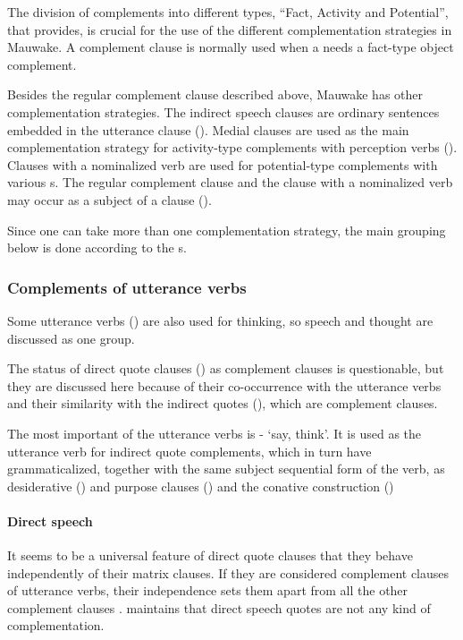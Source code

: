 The division of complements into different types, ``Fact, Activity and Potential'', that \citet[371]{Dixon2010b} provides, is crucial for the use of the different complementation strategies in Mauwake.  A complement clause is normally used when a  needs a fact-type object complement.

Besides the regular complement clause described above, Mauwake has other complementation strategies. The indirect speech clauses are ordinary sentences embedded in the utterance clause (). Medial clauses are used as the main complementation strategy for activity-type complements with perception verbs (). Clauses with a nominalized verb are used for potential-type complements with various s. The regular complement clause and the clause with a nominalized verb may occur as a subject of a clause (). 

Since one  can take more than one complementation strategy, the main grouping below is done according to the s.

\subsubsection[Complements of utterance verbs]{Complements of utterance verbs}
\hypertarget{RefHeading23421935131865}{}
Some utterance verbs () are also used for thinking, so speech and thought are discussed as one group. 

The status of direct quote clauses () as complement clauses is questionable, but they are discussed here because of their co-occurrence with the utterance verbs and their similarity with the indirect quotes (), which are complement clauses.  

The most important of the utterance verbs is - `say, think'. It is used as the utterance verb for indirect quote complements, which in turn have grammaticalized, together with the same subject sequential form of the verb, as desiderative () and purpose clauses () and the conative construction () 

\paragraph[Direct speech]{Direct speech}
\hypertarget{RefHeading23441935131865}{}
It seems to be a universal feature of direct quote clauses that they behave independently of their matrix clauses. If they are considered complement clauses of utterance verbs, their independence sets them apart from all the other complement clauses \citep[303]{Munro1982}. \citet[398]{Dixon2010} maintains that direct speech quotes are not any kind of complementation.

